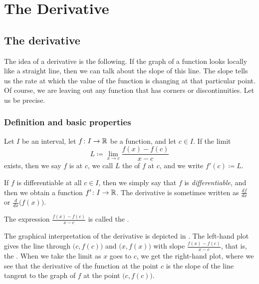 \chapter{The Derivative} \label{der:chapter}


\section{The derivative}
\label{sec:der}



The idea of a derivative is the following.
If the graph of a function looks locally like a straight line,
then we can talk about the slope of this line.
The slope tells us the rate at which 
the value of the function is changing at that particular point.
Of course, we are leaving out any function that has corners or
discontinuities.  
Let us be precise.

\subsection{Definition and basic properties}

\begin{defn}
Let $I$ be an interval, let
$f \colon I \to {\mathbb{R}}$ be a function, and let $c \in I$.  If 
the limit
\begin{equation*}
L \coloneqq \lim_{x \to c} \frac{f(x)-f(c)}{x-c} 
\end{equation*}
exists, then we say $f$ is
\emph{} at
$c$, we call $L$ the \emph{} of $f$ at $c$,
and we write $f'(c) \coloneqq L$.

\medskip

If $f$ is differentiable at all $c \in I$, then we simply say that
$f$ is \emph{differentiable}, and then we obtain a function
$f' \colon I \to {\mathbb{R}}$.
The derivative is sometimes written as $\frac{df}{dx}$ or
$\frac{d}{dx}\bigl( f(x) \bigr)$.

\medskip

The expression $\frac{f(x)-f(c)}{x-c}$ is called the
\emph{}.
\end{defn}

The graphical interpretation of the derivative is  depicted in
.  The left-hand plot gives the line through
$\bigl(c,f(c)\bigr)$
and $\bigl(x,f(x)\bigr)$ with slope
$\frac{f(x)-f(c)}{x-c}$, that is,
the \emph{}.  When we take the limit as $x$ goes to $c$,
we get the right-hand plot, where we see
that the derivative of the function
at the point $c$ is the slope of the line tangent to the graph of $f$
at the point $\bigl(c,f(c)\bigr)$.

